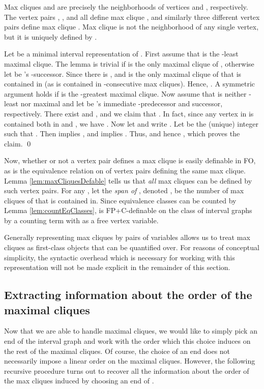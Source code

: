 \documentclass[10pt]{article}
\theoremstyle{remark}
\theoremstyle{definition}
\theoremstyle{plain}
\newcommand{\logic}[1]{\textsf{\upshape\relsize{-0.5}#1}\xspace}
\newcommand{\FPC}{\logic{FP+C}}
\newcommand{\FOL}{\logic{FO}}
\begin{document}
Max cliques  and  are precisely the neighborhoods of vertices  and , respectively. The vertex pairs , , and  all define max clique , and similarly three different vertex pairs define max clique . Max clique  is not the neighborhood of any single vertex, but it is uniquely defined by .


  Let  be a minimal interval representation of . First assume that  is the -least maximal clique. The lemma is trivial if  is the only maximal clique of , otherwise let  be 's -successor. Since  there is , and  is the only maximal clique of  that  is contained in (as  is contained in -consecutive max cliques). Hence, . A symmetric argument holds if  is the -greatest maximal clique. Now assume that  is neither -least nor maximal and let  be 's immediate -predecessor and successor, respectively. There exist  and , and we claim that . In fact, since any vertex in  is contained both in  and , we have . Now let  and write . Let  be the (unique) integer such that . Then  implies , and  implies . Thus,  and hence , which proves the claim. \qed


Now, whether or not a vertex pair  defines a max clique is easily definable in \FOL, as is the equivalence relation on  of vertex pairs defining the same max clique. Lemma \ref{lem:maxCliquesDefable} tells us that \emph{all} max cliques can be defined by such vertex pairs. For any , let the \emph{span of }, denoted , be the number of max cliques of  that  is contained in. Since equivalence classes can be counted by Lemma \ref{lem:countEqClasses},  is \FPC-definable on the class of interval graphs by a counting term with  as a free vertex variable.

Generally representing max cliques by pairs of variables  allows us to treat max cliques as first-class objects that can be quantified over. For reasons of conceptual simplicity, the syntactic overhead which is necessary for working with this representation will not be made explicit in the remainder of this section.

\subsection{Extracting information about the order of the maximal cliques}
Now that we are able to handle maximal cliques, we would like to simply pick an end of the interval graph  and work with the order which this choice induces on the rest of the maximal cliques. Of course, the choice of an end does not necessarily impose a linear order on the maximal cliques. However, the following recursive procedure turns out to recover all the information about the order of the max cliques induced by choosing an end of .
\end{document}
